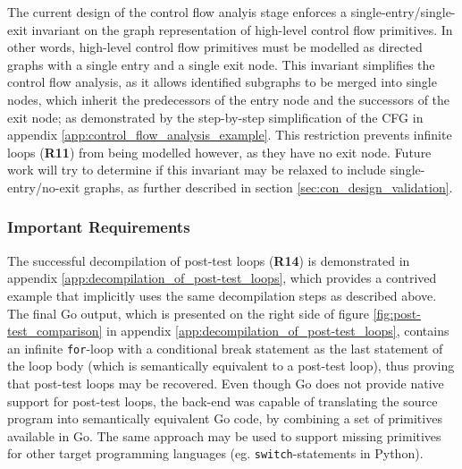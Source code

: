 The current design of the control flow analyis stage enforces a single-entry/single-exit invariant on the graph representation of high-level control flow primitives. In other words, high-level control flow primitives must be modelled as directed graphs with a single entry and a single exit node. This invariant simplifies the control flow analysis, as it allows identified subgraphs to be merged into single nodes, which inherit the predecessors of the entry node and the successors of the exit node; as demonstrated by the step-by-step simplification of the CFG in appendix \ref{app:control_flow_analysis_example}. This restriction prevents infinite loops (\textbf{R11}) from being modelled however, as they have no exit node. Future work will try to determine if this invariant may be relaxed to include single-entry/no-exit graphs, as further described in section \ref{sec:con_design_validation}.


\subsubsection{Important Requirements}
\label{sec:eval_control_flow_analysis_library_important_requirements}


The successful decompilation of post-test loops (\textbf{R14}) is demonstrated in appendix \ref{app:decompilation_of_post-test_loops}, which provides a contrived example that implicitly uses the same decompilation steps as described above. The final Go output, which is presented on the right side of figure \ref{fig:post-test_comparison} in appendix \ref{app:decompilation_of_post-test_loops}, contains an infinite \texttt{for}-loop with a conditional break statement as the last statement of the loop body (which is semantically equivalent to a post-test loop), thus proving that post-test loops may be recovered. Even though Go does not provide native support for post-test loops, the back-end was capable of translating the source program into semantically equivalent Go code, by combining a set of primitives available in Go. The same approach may be used to support missing primitives for other target programming languages (eg. \texttt{switch}-statements in Python).


